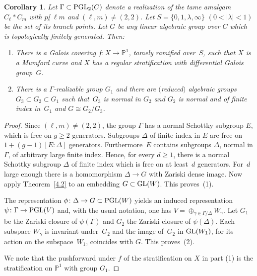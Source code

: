 \documentclass[pdftex]{sigma}
\numberwithin{equation}{section}
\newtheorem{Corollary}[Theorem]{Corollary}
\begin{document}
\begin{Corollary}\label{5.5} Let $\Gamma\subset {\rm PGL}_2(C)$ denote a realization of the tame amalgam $C_\ell\ast C_m$ with $p\, {\not |}\, \ell m$ and $(\ell,m)\neq (2,2)$. Let $S=\{0,1,\lambda ,\infty\}$ $(0<|\lambda |<1)$ be the set of its branch points. Let $G$ be any linear algebraic group over $C$ which is topologically finitely generated. Then:
\begin{enumerate}\itemsep=0pt
\item[$(1)$] There is a Galois covering $f\colon X\rightarrow \mathbb{P}^1$, tamely ramified over~$S$, such that $X$ is a Mumford curve and $X$ has a regular stratification with differential Galois group~$G$.
\item[$(2)$] There is a $\Gamma$-realizable group $G_1$ and there are $($reduced$)$ algebraic groups $G_3\subset G_2\subset G_1$ such that~$G_3$ is normal in $G_2$ and $G_2$ is normal and of finite index in~$G_1$ and $G\cong G_2/G_3$.
\end{enumerate}
 \end{Corollary}

 \begin{proof} Since $(\ell ,m)\neq (2,2)$, the group $\Gamma$ has a normal Schottky subgroup $E$, which is free on $g\geq 2$ generators. Subgroups $\Delta$ of finite index in $E$ are free on $1+(g-1)[E:\Delta]$ generators. Furthermore~$E$ contains subgroups $\Delta$, normal in $\Gamma$, of arbitrary large finite index. Hence, for every $d\geq 1$, there is a normal Schottky subgroup $\Delta$ of finite index which is free on at least~$d$ generators. For~$d$ large enough there is a homomorphism $\Delta \rightarrow G$ with Zariski dense image. Now apply Theorem~\ref{4.2} to an embedding $G\subset {\rm GL}(W)$. This proves~(1).

 The representation $\phi\colon \Delta \rightarrow G\subset {\rm PGL}(W)$ yields an induced representation $\psi\colon \Gamma \rightarrow {\rm PGL}(V)$ and, with the usual notation, one has $V=\oplus _{\gamma \in \Gamma /\Delta}W_\gamma$. Let $G_1$ be the Zariski closure of $\psi (\Gamma)$ and $G_2$ the Zariski closure of $\psi(\Delta)$. Each subspace $W_\gamma$ is invariant under~$G_2$ and the image of~$G_2$ in ${\rm GL}(W_1)$, for its action on the subspace~$W_1$, coincides with $G$. This proves~(2).

 We note that the pushforward under $f$ of the stratification on $X$ in part (1) is the stratification on $\mathbb{P}^1$ with group $G_1$.
 \end{proof}
\end{document}
